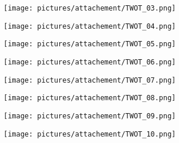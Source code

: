 \begin{figure} \ContinuedFloat
        \centering
        \begin{subfigure}{.49\textwidth}
                \centering
                \texttt{[image: pictures/attachement/TWOT\_03.png]}
        \end{subfigure}
        \begin{subfigure}{.49\textwidth}
                \centering
                \texttt{[image: pictures/attachement/TWOT\_04.png]}
        \end{subfigure}
\end{figure}
\begin{figure} \ContinuedFloat
        \centering
        \begin{subfigure}{.49\textwidth}
                \centering
                \texttt{[image: pictures/attachement/TWOT\_05.png]}
        \end{subfigure}
        \begin{subfigure}{.49\textwidth}
                \centering
                \texttt{[image: pictures/attachement/TWOT\_06.png]}
        \end{subfigure}
\end{figure}
\begin{figure} \ContinuedFloat
        \centering
        \begin{subfigure}{.49\textwidth}
                \centering
                \texttt{[image: pictures/attachement/TWOT\_07.png]}
        \end{subfigure}
        \begin{subfigure}{.49\textwidth}
                \centering
                \texttt{[image: pictures/attachement/TWOT\_08.png]}
        \end{subfigure}
\end{figure}
\begin{figure} \ContinuedFloat
        \centering
        \begin{subfigure}{.49\textwidth}
                \centering
                \texttt{[image: pictures/attachement/TWOT\_09.png]}
        \end{subfigure}
        \begin{subfigure}{.49\textwidth}
                \centering
                \texttt{[image: pictures/attachement/TWOT\_10.png]}
        \end{subfigure}
\end{figure}
